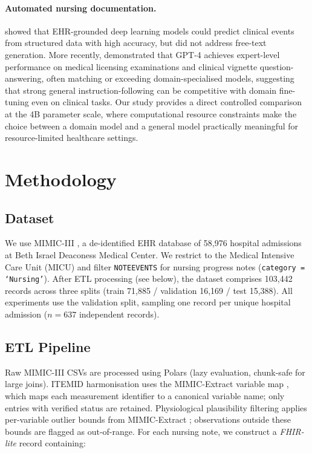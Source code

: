 \documentclass[sigconf,anonymous=false,review=false]{acmart}
\begin{document}
\paragraph{Automated nursing documentation.}
\citet{rajkomar2018scalable} showed that EHR-grounded deep learning models
could predict clinical events from structured data with high accuracy, but
did not address free-text generation. More recently, \citet{nori2023capabilities} demonstrated that GPT-4 achieves
expert-level performance on medical licensing examinations and clinical
vignette question-answering, often matching or exceeding domain-specialised
models, suggesting that strong general instruction-following can be
competitive with domain fine-tuning even on clinical tasks. Our study provides a direct controlled
comparison at the 4B parameter scale, where computational resource constraints
make the choice between a domain model and a general model practically
meaningful for resource-limited healthcare settings.

\section{Methodology}
\label{sec:methods}

\subsection{Dataset}

We use MIMIC-III \cite{johnson2016mimic}, a de-identified EHR database of
58,976 hospital admissions at Beth Israel Deaconess Medical Center. We
restrict to the Medical Intensive Care Unit (MICU) and filter
\texttt{NOTEEVENTS} for nursing progress notes (\texttt{category = `Nursing'}).
After ETL processing (see below), the dataset comprises 103,442 records across
three splits (train 71,885 / validation 16,169 / test 15,388). All experiments
use the validation split, sampling one record per unique hospital admission
($n = 637$ independent records).

\subsection{ETL Pipeline}

Raw MIMIC-III CSVs are processed using Polars
(lazy evaluation, chunk-safe for large joins). ITEMID harmonisation uses
the MIMIC-Extract variable map \cite{wang2020mimic}, which maps each measurement
identifier to a canonical variable name; only entries with verified status
are retained. Physiological plausibility filtering applies
per-variable outlier bounds from MIMIC-Extract \cite{wang2020mimic};
observations outside these bounds are flagged as out-of-range.
For each nursing note, we construct a \emph{FHIR-lite} record containing:
\end{document}
